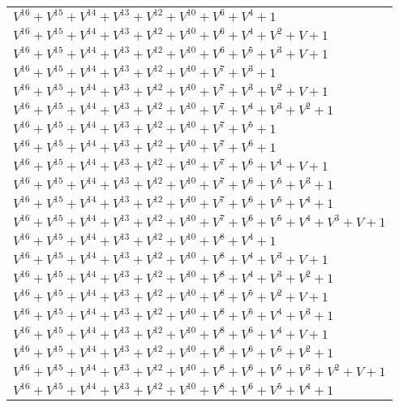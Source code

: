 \documentclass[12pt]{article}
\begin{document}
\begin{adjustwidth}{-4cm}{}
\begin{center}
\begin{longtable}{|l|}
$V^{16}  +V^{15}  +V^{14}  +V^{13}  +V^{12}  +V^{10}  +V^{6}  +V^{4}  + 1$ \\
$V^{16}  +V^{15}  +V^{14}  +V^{13}  +V^{12}  +V^{10}  +V^{6}  +V^{4}  +V^{2}  + V + 1$ \\
$V^{16}  +V^{15}  +V^{14}  +V^{13}  +V^{12}  +V^{10}  +V^{6}  +V^{5}  +V^{3}  + V + 1$ \\
$V^{16}  +V^{15}  +V^{14}  +V^{13}  +V^{12}  +V^{10}  +V^{7}  +V^{3}  + 1$ \\
$V^{16}  +V^{15}  +V^{14}  +V^{13}  +V^{12}  +V^{10}  +V^{7}  +V^{3}  +V^{2}  + V + 1$ \\
$V^{16}  +V^{15}  +V^{14}  +V^{13}  +V^{12}  +V^{10}  +V^{7}  +V^{4}  +V^{3}  +V^{2}  + 1$ \\
$V^{16}  +V^{15}  +V^{14}  +V^{13}  +V^{12}  +V^{10}  +V^{7}  +V^{5}  + 1$ \\
$V^{16}  +V^{15}  +V^{14}  +V^{13}  +V^{12}  +V^{10}  +V^{7}  +V^{6}  + 1$ \\
$V^{16}  +V^{15}  +V^{14}  +V^{13}  +V^{12}  +V^{10}  +V^{7}  +V^{6}  +V^{4}  + V + 1$ \\
$V^{16}  +V^{15}  +V^{14}  +V^{13}  +V^{12}  +V^{10}  +V^{7}  +V^{6}  +V^{5}  +V^{3}  + 1$ \\
$V^{16}  +V^{15}  +V^{14}  +V^{13}  +V^{12}  +V^{10}  +V^{7}  +V^{6}  +V^{5}  +V^{4}  + 1$ \\
$V^{16}  +V^{15}  +V^{14}  +V^{13}  +V^{12}  +V^{10}  +V^{7}  +V^{6}  +V^{5}  +V^{4}  +V^{3}  + V + 1$ \\
$V^{16}  +V^{15}  +V^{14}  +V^{13}  +V^{12}  +V^{10}  +V^{8}  +V^{4}  + 1$ \\
$V^{16}  +V^{15}  +V^{14}  +V^{13}  +V^{12}  +V^{10}  +V^{8}  +V^{4}  +V^{3}  + V + 1$ \\
$V^{16}  +V^{15}  +V^{14}  +V^{13}  +V^{12}  +V^{10}  +V^{8}  +V^{4}  +V^{3}  +V^{2}  + 1$ \\
$V^{16}  +V^{15}  +V^{14}  +V^{13}  +V^{12}  +V^{10}  +V^{8}  +V^{5}  +V^{2}  + V + 1$ \\
$V^{16}  +V^{15}  +V^{14}  +V^{13}  +V^{12}  +V^{10}  +V^{8}  +V^{5}  +V^{4}  +V^{3}  + 1$ \\
$V^{16}  +V^{15}  +V^{14}  +V^{13}  +V^{12}  +V^{10}  +V^{8}  +V^{6}  +V^{4}  + V + 1$ \\
$V^{16}  +V^{15}  +V^{14}  +V^{13}  +V^{12}  +V^{10}  +V^{8}  +V^{6}  +V^{5}  +V^{2}  + 1$ \\
$V^{16}  +V^{15}  +V^{14}  +V^{13}  +V^{12}  +V^{10}  +V^{8}  +V^{6}  +V^{5}  +V^{3}  +V^{2}  + V + 1$ \\
$V^{16}  +V^{15}  +V^{14}  +V^{13}  +V^{12}  +V^{10}  +V^{8}  +V^{6}  +V^{5}  +V^{4}  + 1$ \\

\end{longtable}
\end{center}
\end{adjustwidth}
\end{document}
